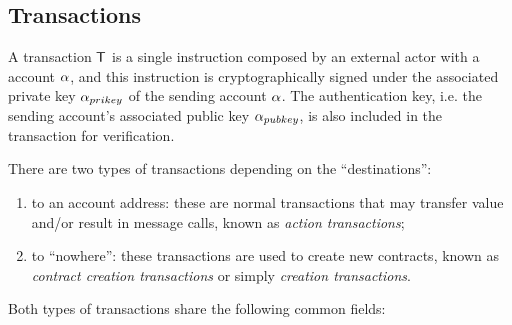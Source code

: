 \subsection{Transactions}
\label{sec:tx}

A {\name} transaction $\textsf{T}$ is a single instruction composed by an external actor with a {\name} account $\mathbf{\alpha}$, and this instruction is cryptographically signed under the associated private key $\mathbf{\alpha}_{prikey}$ of the sending account $\mathbf{\alpha}$.
The authentication key, i.e. the sending account's associated public key $\mathbf{\alpha}_{pubkey}$, is also included in the transaction for verification.

There are two types of transactions depending on the ``destinations'': 
\begin{enumerate}[nosep]
	\item {to an account address:} these are normal transactions that may transfer value and/or result in message calls, known as \emph{action transactions};

	\item {to ``nowhere'':} these transactions are used to create new contracts, known as \emph{contract creation transactions} or simply \emph{creation transactions}.
\end{enumerate}
Both types of transactions share the following common fields:
